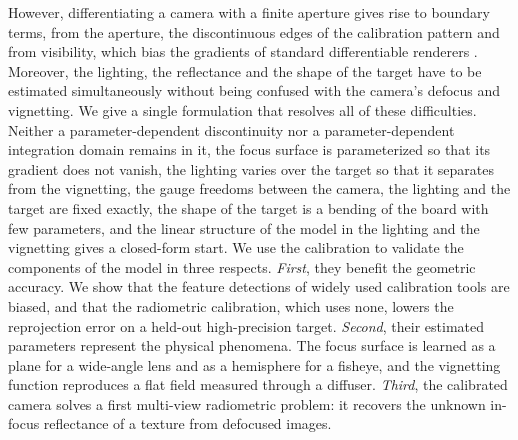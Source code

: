 However, differentiating a camera
with a finite aperture gives rise to boundary terms, from the
aperture, the discontinuous edges of the calibration pattern and from
visibility, which bias the gradients of standard differentiable
renderers \cite{Zhang:2020:PSDR}. Moreover, the lighting, the reflectance and the shape of
the target have to be estimated simultaneously without being confused
with the camera's defocus and vignetting. We give a single formulation
that resolves all of these difficulties. Neither a parameter-dependent
discontinuity nor a parameter-dependent integration domain remains in
it, the focus surface is parameterized so that its gradient does not
vanish, the lighting varies over the target so that it separates from
the vignetting, the gauge freedoms between the camera,
the lighting and the target are fixed exactly, the shape of the
target is a bending of the board with few parameters, and the linear
structure of the model in the lighting and the vignetting gives a
closed-form start. We use the calibration to validate the components
of the model in three respects. \textit{First}, they benefit the geometric
accuracy. We show that the feature detections of widely used
calibration tools are biased, and that the radiometric calibration,
which uses none, lowers the reprojection error on a held-out
high-precision target. \textit{Second}, their estimated parameters represent
the physical phenomena. The focus surface is learned as a plane for a wide-angle lens and as
a hemisphere for a fisheye, and the vignetting function reproduces a
flat field measured through a diffuser. \textit{Third}, the calibrated camera
solves a first multi-view radiometric problem: it recovers the
unknown in-focus reflectance of a texture from defocused images.



